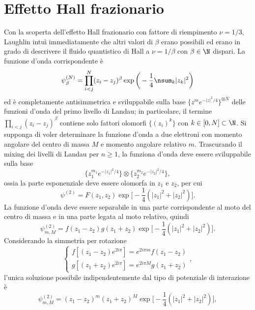 \section{Effetto Hall frazionario}
Con la scoperta dell'effetto Hall frazionario con fattore di riempimento $\nu = 1/3$, Laughlin intuì immediatamente che altri valori di $\beta$ erano possibili ed erano in grado di descrivere il fluido quantistico di Hall a $\nu = 1/\beta$ con $\beta \in \N$ dispari. La funzione d'onda corrispondente è
\begin{equation}
    \psi_\beta^{(N)} = \prod_{i < j}^N(z_i - z_j)^\beta\exp{\bigg(-\frac{1}{4}\nsum_k|z_k|^2\bigg)}
\end{equation}
ed è completamente antisimmetrica e sviluppabile sulla base $\{z^me^{-|z|^2/4}\}^{\otimes N}$ delle funzioni d'onda del primo livello di Landau; in particolare, il termine $\prod_{i < j}(z_i - z_j)^\beta$ contiene solo fattori olomorfi $\{(z_i)^k\}$ con $k \in [0,N] \subset \N$. Si supponga di voler determinare la funzione d'onda a due elettroni con momento angolare del centro di massa $M$ e momento angolare relativo $m$. Trascurando il mixing dei livelli di Landau per $n \ge 1$, la funziona d'onda deve essere sviluppabile sulla base 
\begin{equation}
    \{z_1^{m_1}e^{-|z_1|^2/4}\} \otimes \{z_2^{m_2}e^{-|z_2|^2/4}\},
\end{equation}
ossia la parte esponenziale deve essere olomorfa in $z_1$ e $z_2$, per cui 
\begin{equation}
    \psi^{(2)} = F(z_1,z_2)\exp{\bigg[-\frac{1}{4}(|z_1|^2 + |z_2|^2)\bigg]}.
\end{equation}
La funzione d'onda deve essere separabile in una parte corrispondente al moto del centro di massa e in una parte legata al moto relativo, quindi
\begin{equation}
    \psi^{(2)}_{m,M} = f(z_1 - z_2)g(z_1 + z_2)\exp{\bigg[-\frac{1}{4}(|z_1|^2 + |z_2|^2)\bigg]}.
\end{equation}
Considerando la simmetria per rotazione 
\begin{equation}
    \begin{cases}
        f[(z_1 - z_2)e^{2i\pi}] = e^{2i\pi m}f(z_1 - z_2) \\
        g[(z_1 + z_2)e^{2i\pi}] = e^{2i\pi M}g(z_1 + z_2)
    \end{cases},
\end{equation}
l'unica soluzione possibile indipendentemente dal tipo di potenziale di interazione è
\begin{equation}
    \psi^{(2)}_{m,M} = (z_1 - z_2)^m(z_1 + z_2)^M\exp{\bigg[-\frac{1}{4}(|z_1|^2 + |z_2|^2)\bigg]},
\end{equation}
